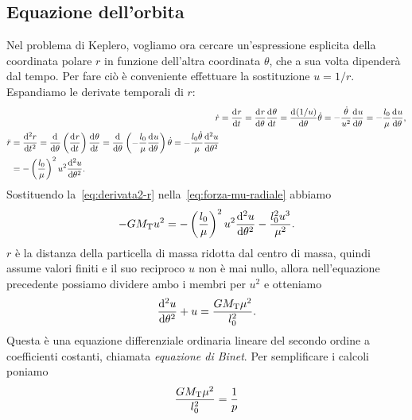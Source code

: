 \subsection{Equazione dell'orbita}
\label{sec:equazione-dellorbita}

Nel problema di Keplero, vogliamo ora cercare un'espressione esplicita della
coordinata polare $r$ in funzione dell'altra coordinata $\theta$, che a sua
volta dipenderà dal tempo. Per fare ciò è conveniente effettuare la sostituzione
$u=1/r$. Espandiamo le derivate temporali di $r$:
\begin{subequations}
  \begin{align}
    \dot{r} &= \toder{r}{t} = \toder{r}{\theta}\toder{\theta}{t} =
    \toder{(1/u)}{\theta}\dot{\theta} =
    -\frac{\dot{\theta}}{u^2}\toder{u}{\theta}
    = -\frac{l_0}{\mu}\toder{u}{\theta}, \label{eq:derivata1-r}\\
    \begin{split}
      \ddot{r} &= \toder[2]{r}{t} = \toder{}{\theta} \left( \toder{r}{t}
      \right)\toder{\theta}{t} = \toder{}{\theta} \left(
        -\frac{l_0}{\mu}\toder{u}{\theta} \right)\dot{\theta} =
      -\frac{l_0\dot{\theta}}{\mu}\toder[2]{u}{\theta} \\
      &= - \left(
        \frac{l_0}{\mu} \right)^2u^2\toder[2]{u}{\theta}. \label{eq:derivata2-r}
    \end{split}
  \end{align}
\end{subequations}
Sostituendo la~\eqref{eq:derivata2-r} nella~\eqref{eq:forza-mu-radiale} abbiamo
\begin{equation}
  -GM_\textup{T}u^2 = -\left(
        \frac{l_0}{\mu} \right)^2u^2\toder[2]{u}{\theta} - \frac{l_0^2u^3}{\mu^2}.
\end{equation}
$r$ è la distanza della particella di massa ridotta dal centro di massa, quindi
assume valori finiti e il suo reciproco $u$ non è mai nullo, allora
nell'equazione precedente possiamo dividere ambo i membri per $u^2$ e otteniamo
\begin{equation}
  \toder[2]{u}{\theta} + u = \frac{GM_\textup{T}\mu^2}{l_0^2}.
\end{equation}
Questa è una equazione differenziale ordinaria lineare del secondo ordine a
coefficienti costanti, chiamata \emph{equazione di Binet}. Per semplificare i
calcoli poniamo
\begin{equation}
  \label{eq:reciproco-semilato}
  \frac{GM_\textup{T}\mu^2}{l_0^2} = \frac{1}{p}
\end{equation}
